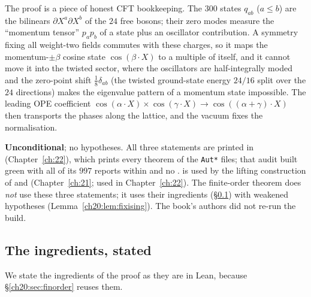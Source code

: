 \begin{physics}
The proof is a piece of honest CFT bookkeeping.  The $300$ states $q_{ab}$ ($a\le b$) are the bilinears $\partial X^a\partial X^b$
of the $24$ free bosons; their zero modes measure the ``momentum tensor'' $p_ap_b$ of a state plus an oscillator
contribution.  A symmetry fixing all weight-two fields commutes with these charges, so it maps the momentum-$\pm\beta$
cosine state $\cos(\beta\cdot X)$ to a multiple of itself, and it cannot move it into the twisted sector, where the
oscillators are half-integrally moded and the zero-point shift $\tfrac18\delta_{ab}$ (the twisted ground-state
energy $24/16$ split over the $24$ directions) makes the eigenvalue pattern of a momentum state impossible.  The
leading OPE coefficient $\cos(\alpha\cdot X)\times\cos(\gamma\cdot X)\to\cos((\alpha+\gamma)\cdot X)$ then transports the
phases along the lattice, and the vacuum fixes the normalisation.
\end{physics}
\begin{status}
\textbf{Unconditional}; no hypotheses.  All three statements are printed in  (Chapter~\ref{ch:22}), which
prints every theorem of the \texttt{Aut*} files; that audit built green with all of its $997$ reports within
 and no .  
is used by the lifting construction of  and
 (Chapter~\ref{ch:21}; used in Chapter~\ref{ch:22}).  The finite-order theorem does \emph{not} use these three statements;
it uses their ingredients (\S\ref{ch20:sec:techfaith}) with weakened hypotheses (Lemma~\ref{ch20:lem:fixising}).  The book's
authors did not re-run the build.
\end{status}

\subsection{The ingredients, stated}\label{ch20:sec:techfaith}

We state the ingredients of the proof as they are in Lean, because \S\ref{ch20:sec:finorder} reuses them.

